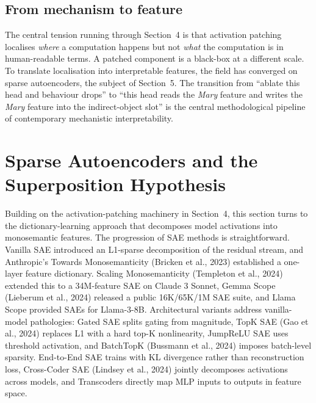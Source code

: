 \documentclass{article}
\begin{document}
\subsection{From mechanism to feature}\label{from-mechanism-to-feature}

The central tension running through Section~4 is that activation patching localises \emph{where} a computation happens but not \emph{what} the computation is in human-readable terms. A patched component is a black-box at a different scale. To translate localisation into interpretable features, the field has converged on sparse autoencoders, the subject of Section~5. The transition from ``ablate this head and behaviour drops'' to ``this head reads the \emph{Mary} feature and writes the \emph{Mary} feature into the indirect-object slot'' is the central methodological pipeline of contemporary mechanistic interpretability.

\section{Sparse Autoencoders and the Superposition Hypothesis}\label{sparse-autoencoders-and-the-superposition-hypothesis}

Building on the activation-patching machinery in Section~4, this section turns to the dictionary-learning approach that decomposes model activations into monosemantic features. The progression of SAE methods is straightforward. Vanilla SAE \citep{cunningham2023sparseautoencoders} introduced an L1-sparse decomposition of the residual stream, and Anthropic's Towards Monosemanticity (Bricken et al., 2023) established a one-layer feature dictionary. Scaling Monosemanticity (Templeton et al., 2024) extended this to a 34M-feature SAE on Claude 3 Sonnet, Gemma Scope (Lieberum et al., 2024) released a public 16K/65K/1M SAE suite, and Llama Scope \citep{he2024dictionarylearning} provided SAEs for Llama-3-8B. Architectural variants address vanilla-model pathologies: Gated SAE \citep{rajamanoharan2024improvingdictionar} splits gating from magnitude, TopK SAE (Gao et al., 2024) replaces L1 with a hard top-K nonlinearity, JumpReLU SAE \citep{rajamanoharan2024improvingdictionar} uses threshold activation, and BatchTopK (Bussmann et al., 2024) imposes batch-level sparsity. End-to-End SAE \citep{braun2024identifyingfunctio} trains with KL divergence rather than reconstruction loss, Cross-Coder SAE (Lindsey et al., 2024) jointly decomposes activations across models, and Transcoders \citep{dunefsky2025oneshotoptimizedst} directly map MLP inputs to outputs in feature space.
\end{document}
